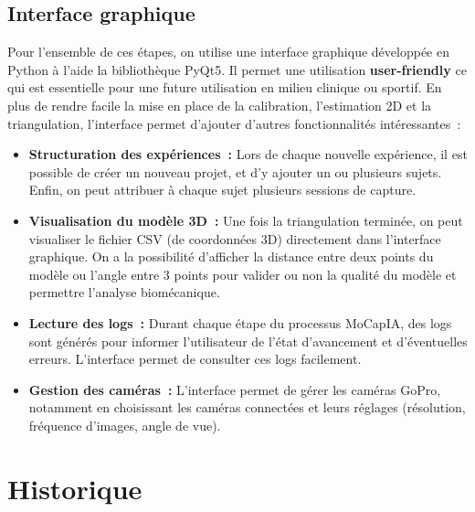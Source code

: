     \subsection{Interface graphique}
        
        Pour l'ensemble de ces étapes, on utilise une interface graphique développée en Python à l'aide la bibliothèque PyQt5. Il permet une utilisation \textbf{user-friendly} ce qui est essentielle pour une future utilisation en milieu clinique ou sportif. En plus de rendre facile la mise en place de la calibration, l'estimation 2D et la triangulation, l'interface permet d'ajouter d'autres fonctionnalités intéressantes :
        \begin{itemize}
            \item \textbf{Structuration des expériences :} Lors de chaque nouvelle expérience, il est possible de créer un nouveau projet, et d'y ajouter un ou plusieurs sujets. Enfin, on peut attribuer à chaque sujet plusieurs sessions de capture.
            \item \textbf{Visualisation du modèle 3D :} Une fois la triangulation terminée, on peut visualiser le fichier CSV (de coordonnées 3D) directement dans l'interface graphique. On a la possibilité d'afficher la distance entre deux points du modèle ou l'angle entre 3 points pour valider ou non la qualité du modèle et permettre l'analyse biomécanique.
            \item \textbf{Lecture des logs :} Durant chaque étape du processus MoCapIA, des logs sont générés pour informer l'utilisateur de l'état d'avancement et d'éventuelles erreurs. L'interface permet de consulter ces logs facilement.
            \item \textbf{Gestion des caméras :} L'interface permet de gérer les caméras GoPro, notamment en choisissant les caméras connectées et leurs réglages (résolution, fréquence d'images, angle de vue).
        \end{itemize}

\section{Historique}

